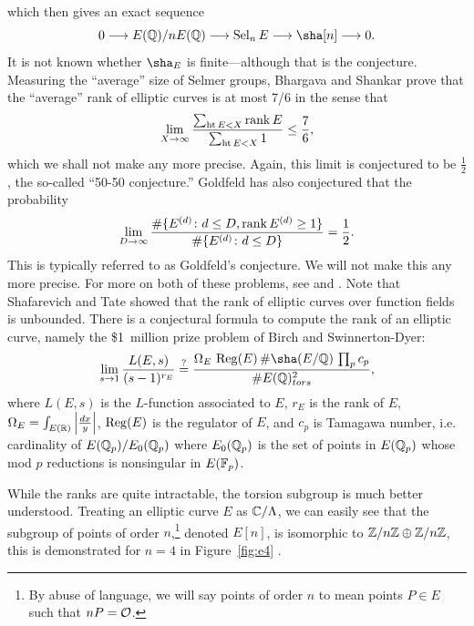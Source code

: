 which then gives an exact sequence
	\[
	0 \ma{} E(\Q)/nE(\Q) \ma{} \sel_n E \ma{} \sha[n] \ma{} 0.
	\]
It is not known whether $\sha_E$ is finite---although that is the conjecture. Measuring the ``average'' size of Selmer groups, Bhargava and Shankar \cite{bhargavashankar15} prove that the ``average'' rank of elliptic curves is at most 7/6 in the sense that 
	\[
	\lim_{X \to \infty} \dfrac{\sum_{\operatorname{ht} E < X} \operatorname{rank} E}{\sum_{\operatorname{ht} E < X} 1} \leq \dfrac{7}{6}, 
	\]
which we shall not make any more precise. Again, this limit is conjectured to be $\frac{1}{2}$, the so-called ``50-50 conjecture.'' Goldfeld has also conjectured that the probability
	\[
	\lim_{D \to \infty} \dfrac{\# \{ E^{(d)} \colon d \leq D, \operatorname{rank} E^{(d)} \geq 1 \}}{\#\{ E^{(d)} \colon d \leq D \}}= \dfrac{1}{2}. 
	\]
This is typically referred to as Goldfeld's conjecture. We will not make this any more precise. For more on both of these problems, see \cite{bektemirovmazursteinwatkins07} and \cite{poonen15}. Note that Shafarevich and Tate \cite{shatate67} showed that the rank of elliptic curves over function fields is unbounded. There is a conjectural formula to compute the rank of an elliptic curve, namely the \$1~million prize problem of Birch and Swinnerton-Dyer:
	\[
	\lim_{s \to 1} \dfrac{L(E,s)}{(s-1)^{r_E}} \stackrel{?}{=} \dfrac{\Omega_E \, \Reg(E) \, \#\sha(E/\Q) \, \prod_p c_p}{\#E(\Q)_{tors}^2},
	\]
where $L(E,s)$ is the $L$-function associated to $E$, $r_E$ is the rank of $E$, $\Omega_E= \int_{E(\mathbb{R})} \left| \frac{dx}{y} \right|$, $\operatorname{Reg}(E)$ is the regulator of $E$, and $c_p$ is Tamagawa number, i.e. cardinality of $E(\mathbb{Q}_p)/E_0(\mathbb{Q}_p)$ where $E_0(\mathbb{Q}_p)$ is the set of points in $E(\mathbb{Q}_p)$ whose mod $p$ reductions is nonsingular in $E(\mathbb{F}_p)$. 


While the ranks are quite intractable, the torsion subgroup is much better understood. Treating an elliptic curve $E$ as $\mathbb{C}/\Lambda$, we can easily see that the subgroup of points of order $n$,\footnote{By abuse of language, we will say points of order $n$ to mean points $P \in E$ such that $nP= \mathcal{O}$.} denoted $E[n]$, is isomorphic to $\mathbb{Z}/n\mathbb{Z} \oplus \mathbb{Z}/n\mathbb{Z}$, this is demonstrated for $n= 4$ in Figure~\ref{fig:e4} \cite{periodparallelogram}. 

